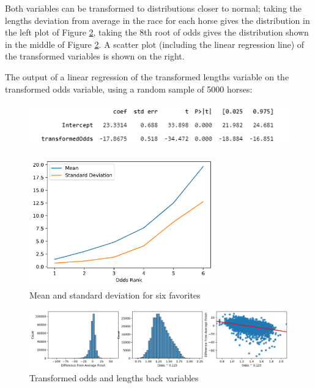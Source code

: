 \documentclass{article}
\begin{document}
Both variables can be transformed to distributions closer to normal; taking the lengths deviation from average in the race for each horse gives the distribution in the left plot of Figure \ref{figure:oddsLengthsYesTrans}, taking the 8th root of odds gives the distribution shown in the middle of Figure \ref{figure:oddsLengthsYesTrans}. A scatter plot (including the linear regression line) of the transformed variables is shown on the right. 

The output of a linear regression of the transformed lengths variable on the transformed odds variable, using a random sample of 5000 horses:

\begin{figure}[h]
    \includegraphics[width=12cm]{images/odds_lengths_regression.png}   
\end{figure}

\begin{figure}
    \centering
    \includegraphics[width=8cm]{images/odds_rank_means_stds.png}

    \caption{Mean and standard deviation for six favorites} 
    \label{figure:oddsRankMeansStds}   
\end{figure}

\begin{figure}
    \centering
    \includegraphics[width=13cm]{images/lengths_odds_yes_trans_chart.png}

    \caption{Transformed odds and lengths back variables}
    \label{figure:oddsLengthsYesTrans}
\end{figure}
\end{document}
